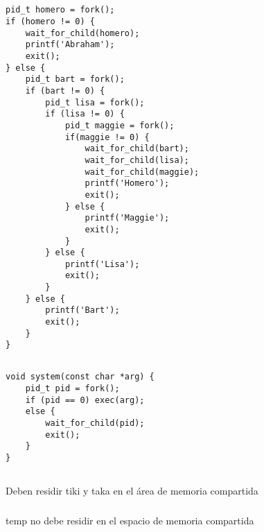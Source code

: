 \setcounter{subsection}{4}
\subsection{}

\begin{codesnippet}
\begin{verbatim}
pid_t homero = fork();
if (homero != 0) {
    wait_for_child(homero);
    printf('Abraham');
    exit();
} else {
    pid_t bart = fork();
    if (bart != 0) {
        pid_t lisa = fork();
        if (lisa != 0) {
            pid_t maggie = fork();
            if(maggie != 0) {
                wait_for_child(bart);
                wait_for_child(lisa);
                wait_for_child(maggie);
                printf('Homero');
                exit();
            } else {
                printf('Maggie');
                exit();
            }
        } else {
            printf('Lisa');
            exit();
        }
    } else {
        printf('Bart');
        exit();
    }
}
\end{verbatim}
\end{codesnippet}

\subsection{}

\begin{codesnippet}
\begin{verbatim}
void system(const char *arg) {
    pid_t pid = fork();
    if (pid == 0) exec(arg);
    else {
        wait_for_child(pid);
        exit();
    }
}
\end{verbatim}
\end{codesnippet}

\subsection{}

\subsubsection{}

Deben residir tiki y taka en el área de memoria compartida

\subsubsection{}

temp no debe residir en el espacio de memoria compartida

